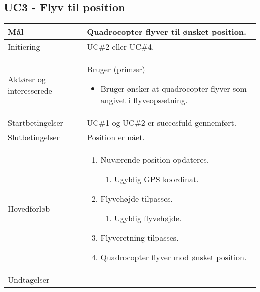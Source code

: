\subsection*{UC3 - Flyv til position}

\begin{table}[H]
\begin{tabular}{| p{3cm}| p{11.5cm}|}
\hline

Mål	 							& Quadrocopter flyver til ønsket position. \\\hline
Initiering 							& UC\#2 eller UC\#4. \\\hline
Aktører og interesserede			& Bruger (primær) 
										\begin{itemize}
											\item Bruger ønsker at quadrocopter flyver som angivet i flyveopsætning.
										\end{itemize} \\\hline
Startbetingelser							& UC\#1 og UC\#2 er succesfuld gennemført. \\\hline
Slutbetingelser						& Position er nået. \\\hline
Hovedforløb				&
 
									\renewcommand{\labelenumi}{\arabic{enumi}.}
									\renewcommand{\labelenumii}{\Roman{enumii}:}

									\begin{enumerate}[topsep=0.0cm, leftmargin=0.5cm]
										\item Nuværende position opdateres.
											\begin{enumerate}[partopsep=4cm, topsep=0cm, leftmargin=1cm]
												\item Ugyldig GPS koordinat.
											\end{enumerate}
										\item Flyvehøjde tilpasses.
											\begin{enumerate}[partopsep=4cm, topsep=0cm, leftmargin=1cm]
												\item Ugyldig flyvehøjde.
											\end{enumerate}
										\item Flyveretning tilpasses.
										\item Quadrocopter flyver mod ønsket position.
									\end{enumerate} \\\hline	

Undtagelser							& 


\end{tabular}
\end{table}

